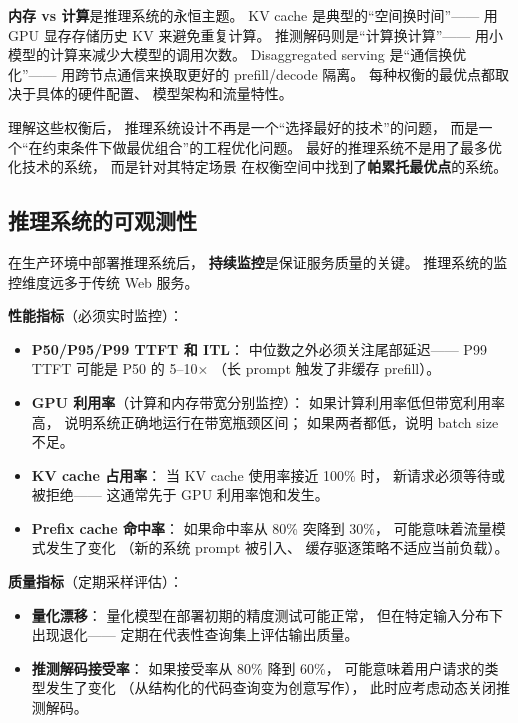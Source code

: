 \textbf{内存 vs 计算}是推理系统的永恒主题。
KV cache 是典型的“空间换时间”——
用 GPU 显存存储历史 KV 来避免重复计算。
推测解码则是“计算换计算”——
用小模型的计算来减少大模型的调用次数。
Disaggregated serving 是“通信换优化”——
用跨节点通信来换取更好的 prefill/decode 隔离。
每种权衡的最优点都取决于具体的硬件配置、
模型架构和流量特性。

理解这些权衡后，
推理系统设计不再是一个“选择最好的技术”的问题，
而是一个“在约束条件下做最优组合”的工程优化问题。
最好的推理系统不是用了最多优化技术的系统，
而是针对其特定场景
在权衡空间中找到了\textbf{帕累托最优点}的系统。

\subsection{推理系统的可观测性}

在生产环境中部署推理系统后，
\textbf{持续监控}是保证服务质量的关键。
推理系统的监控维度远多于传统 Web 服务。

\textbf{性能指标}（必须实时监控）：
\begin{itemize}[noitemsep]
  \item \textbf{P50/P95/P99 TTFT 和 ITL}：
        中位数之外必须关注尾部延迟——
        P99 TTFT 可能是 P50 的 5--10$\times$
        （长 prompt 触发了非缓存 prefill）。
  \item \textbf{GPU 利用率}（计算和内存带宽分别监控）：
        如果计算利用率低但带宽利用率高，
        说明系统正确地运行在带宽瓶颈区间；
        如果两者都低，说明 batch size 不足。
  \item \textbf{KV cache 占用率}：
        当 KV cache 使用率接近 100\% 时，
        新请求必须等待或被拒绝——
        这通常先于 GPU 利用率饱和发生。
  \item \textbf{Prefix cache 命中率}：
        如果命中率从 80\% 突降到 30\%，
        可能意味着流量模式发生了变化
        （新的系统 prompt 被引入、
        缓存驱逐策略不适应当前负载）。
\end{itemize}

\textbf{质量指标}（定期采样评估）：
\begin{itemize}[noitemsep]
  \item \textbf{量化漂移}：
        量化模型在部署初期的精度测试可能正常，
        但在特定输入分布下出现退化——
        定期在代表性查询集上评估输出质量。
  \item \textbf{推测解码接受率}：
        如果接受率从 80\% 降到 60\%，
        可能意味着用户请求的类型发生了变化
        （从结构化的代码查询变为创意写作），
        此时应考虑动态关闭推测解码。
\end{itemize}


